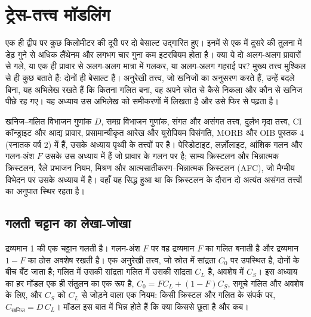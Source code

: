 \chapter{ट्रेस-तत्त्व मॉडलिंग}\label{ch:b3:trace-element-modelling}

एक ही द्वीप पर कुछ किलोमीटर की दूरी पर दो बेसाल्ट उद्गारित हुए। इनमें से एक में
दूसरे की तुलना में डेढ़ गुने से अधिक लैंथेनम और लगभग चार गुना कम इटरबियम होता है।
क्या ये दो अलग-अलग प्रावारों से गले, या एक ही प्रावार से
अलग-अलग मात्रा में गलकर, या अलग-अलग गहराई पर? मुख्य तत्त्व
मुश्किल से ही कुछ बताते हैं: दोनों ही बेसाल्ट हैं। अनुरेखी तत्त्व, जो खनिजों का अनुसरण करते हैं,
उन्हें बदले बिना, यह अभिलेख रखते हैं कि कितना गलित बना, वह अपने स्रोत से कैसे निकला
और कौन से खनिज पीछे रह गए। यह अध्याय उस अभिलेख को
समीकरणों में लिखता है और उसे फिर से पढ़ता है।

\begin{recall}
खनिज--गलित विभाजन गुणांक $D$, समग्र विभाजन गुणांक,
संगत और असंगत तत्त्व, दुर्लभ मृदा तत्त्व, CI
कॉन्ड्राइट और आद्य प्रावार, प्रसामान्यीकृत आरेख और यूरोपियम
विसंगति, MORB और OIB पुस्तक 4 (स्नातक वर्ष 2) में हैं, उसके अध्याय
पृथ्वी के तत्त्वों पर है। पेरिडोटाइट, लर्ज़ोलाइट, आंशिक गलन और गलन-अंश $F$
उसके उस अध्याय में हैं जो प्रावार के गलन पर है; साम्य क्रिस्टलन और
भिन्नात्मक क्रिस्टलन, रैले प्रभाजन नियम, मिश्रण और
आत्मसातीकरण--भिन्नात्मक क्रिस्टलन (AFC), जो मैग्मीय विभेदन पर उसके अध्याय में है।
वहाँ यह सिद्ध हुआ था कि क्रिस्टलन के दौरान दो अत्यंत असंगत
तत्त्वों का अनुपात स्थिर रहता है।
\end{recall}

\section{गलती चट्टान का लेखा-जोखा}\label{sec:b3:trace-element-modelling:balance}

द्रव्यमान 1 की एक चट्टान गलती है। गलन-अंश $F$ पर वह द्रव्यमान $F$ का
गलित बनाती है और द्रव्यमान $1 - F$ का ठोस अवशेष रखती है। एक अनुरेखी तत्त्व, जो स्रोत में
सांद्रता $C_0$ पर उपस्थित है, दोनों के बीच बँट जाता है; गलित में उसकी सांद्रता
गलित में उसकी सांद्रता $C_L$ है, अवशेष में $C_S$। इस अध्याय का हर मॉडल एक ही
संतुलन का एक रूप है, $C_0 = FC_L + (1 - F)C_S$, समूचे गलित और अवशेष के लिए,
और $C_S$ को $C_L$ से जोड़ने वाला एक नियम: किसी क्रिस्टल और
गलित के संपर्क पर, $C_{\text{खनिज}} = D\,C_L$। मॉडल इस बात में भिन्न होते हैं कि क्या किससे
छूता है और कब।

